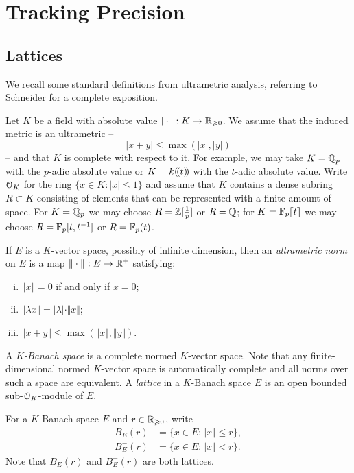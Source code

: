 \documentclass{lms}
\begin{document}

\section{Tracking Precision} \label{sec:prec-proposal}

\subsection{Lattices}

We recall some standard definitions from ultrametric analysis, referring to
Schneider \cite{schneider:11a} for a complete exposition.

Let $K$ be a field with absolute value $|\cdot| : K \to \mathbb R_{\geqslant 0}$.
We assume that the induced metric is an ultrametric -- 
\[ \lvert x + y \rvert \leq \max(\lvert x \rvert, \lvert y \rvert) \]
-- and that $K$ is complete with respect to it.
For example, we may take $K = \mathbb Q_p$ with the
$p$-adic absolute value or $K = k(\!( t )\!)$ with the $t$-adic absolute value.
Write $\OK$ for the ring $\{x \in K : \lvert x \rvert \le 1\}$ and assume
that $K$ contains a dense subring $R \subset K$
consisting of elements that can be represented with a finite amount of space.
For $K = \mathbb Q_p$ we may choose $R = \mathbb Z[\frac1p]$ or $R = \mathbb Q$;
for $K = \mathbb{F}_p\llbracket t \rrbracket$ we may choose $R = \mathbb{F}_p[t, t^{-1}]$ or $R = \mathbb{F}_p(t)$.

If $E$ is a $K$-vector space, possibly of infinite dimension, then an
\emph{ultrametric norm} on $E$ is a map $\Vert\cdot\Vert : E \to \mathbb R^+$ satisfying:
\begin{enumerate}[(i)]
\item $\Vert x\Vert = 0$ if and only if $x = 0$;
\item $\Vert \lambda x\Vert = |\lambda| \cdot \Vert x\Vert$;
\item $\Vert x+y\Vert \leq \max(\Vert x\Vert, \Vert y\Vert)$.
\end{enumerate}
A \emph{$K$-Banach space} is a complete normed $K$-vector space.  Note that any finite-dimensional
normed $K$-vector space is automatically complete and all norms over such a space are equivalent.
A \emph{lattice} in a $K$-Banach space $E$ is an open bounded sub-$\OK$-module of $E$.

For a $K$-Banach space $E$ and $r \in \mathbb R_{\geqslant 0}$, write
\begin{align*}
B_E(r) &= \{ x \in E : \Vert x \Vert \le r \}, \\
B^-_E(r) &= \{ x \in E : \Vert x \Vert < r\}.
\end{align*}
Note that $B_E(r)$ and $B^-_E(r)$ are both lattices.
\end{document}
